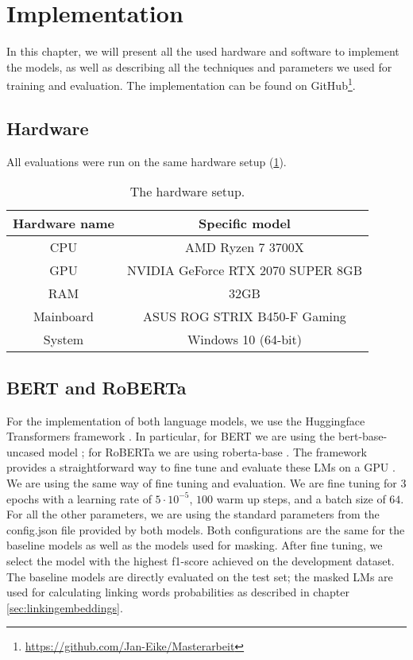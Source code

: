 \section{Implementation}
In this chapter, we will present all the used hardware and software to implement the models, as well as describing all the techniques and parameters we used for training and evaluation. The implementation can be found on GitHub\footnote{\url{https://github.com/Jan-Eike/Masterarbeit}}.

\subsection{Hardware}
All evaluations were run on the same hardware setup (\ref{fig:hardware1}).

\begin{table}[H]
  \begin{center}
   	\begin{tabular}{|| c | c ||}
   	\hline
   	Hardware name & Specific model \\
   	\hline\hline
   	CPU & AMD Ryzen 7 3700X \\
 	\hline
 	GPU & NVIDIA GeForce RTX 2070 SUPER 8GB \\
 	\hline
 	RAM & 32GB \\
 	\hline
 	Mainboard & ASUS ROG STRIX B450-F Gaming \\
 	\hline
 	System & Windows 10 (64-bit) \\
 	\hline
	\end{tabular}
  \end{center}
  \caption{The hardware setup.}%
  \label{fig:hardware1}
\end{table}

\subsection{BERT and RoBERTa} \label{sec:secbert}
For the implementation of both language models, we use the Huggingface Transformers framework \cite{transformers}. In particular, for BERT we are using the bert-base-uncased model \cite{bertbaseuncased}; for RoBERTa we are using roberta-base \cite{robertabase}. The framework provides a straightforward way to fine tune and evaluate these LMs on a GPU \cite{berttraining}. We are using the same way of fine tuning and evaluation. We are fine tuning for $3$ epochs with a learning rate of $5 \cdot 10^{-5}$, $100$ warm up steps, and a batch size of $64$. For all the other parameters, we are using the standard parameters from the config.json file provided by both models. Both configurations are the same for the baseline models as well as the models used for masking. After fine tuning, we select the model with the highest f1-score achieved on the development dataset. \\
The baseline models are directly evaluated on the test set; the masked LMs are used for calculating linking words probabilities as described in chapter \ref{sec:linkingembeddings}.

